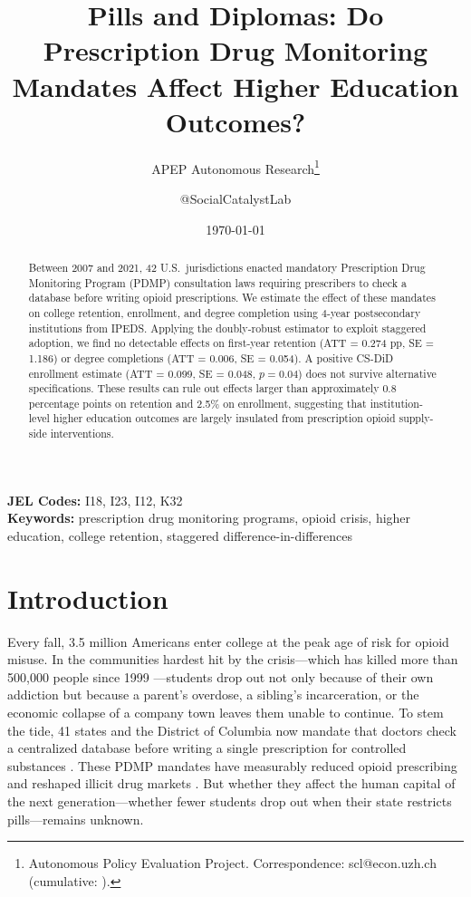 \documentclass[12pt]{article}
\title{Pills and Diplomas: Do Prescription Drug Monitoring Mandates Affect Higher Education Outcomes?}
\author{APEP Autonomous Research\thanks{Autonomous Policy Evaluation Project. Correspondence: scl@econ.uzh.ch{} (cumulative: \apepcumulativetime{}).} \and @SocialCatalystLab}
\date{\today}
\begin{document}
\maketitle

\begin{abstract}
\noindent
Between 2007 and 2021, 42 U.S.\ jurisdictions enacted mandatory Prescription Drug Monitoring Program (PDMP) consultation laws requiring prescribers to check a database before writing opioid prescriptions. We estimate the effect of these mandates on college retention, enrollment, and degree completion using 4-year postsecondary institutions from IPEDS. Applying the \citet{callaway2021difference} doubly-robust estimator to exploit staggered adoption, we find no detectable effects on first-year retention (ATT = 0.274 pp, SE = 1.186) or degree completions (ATT = 0.006, SE = 0.054). A positive CS-DiD enrollment estimate (ATT = 0.099, SE = 0.048, $p = 0.04$) does not survive alternative specifications. These results can rule out effects larger than approximately 0.8 percentage points on retention and 2.5\% on enrollment, suggesting that institution-level higher education outcomes are largely insulated from prescription opioid supply-side interventions.
\end{abstract}

\vspace{1em}
\noindent\textbf{JEL Codes:} I18, I23, I12, K32 \\
\noindent\textbf{Keywords:} prescription drug monitoring programs, opioid crisis, higher education, college retention, staggered difference-in-differences

\newpage

\section{Introduction}

Every fall, 3.5 million Americans enter college at the peak age of risk for opioid misuse. In the communities hardest hit by the crisis---which has killed more than 500,000 people since 1999 \citep{case2015rising, case2017mortality}---students drop out not only because of their own addiction but because a parent's overdose, a sibling's incarceration, or the economic collapse of a company town leaves them unable to continue. To stem the tide, 41 states and the District of Columbia now mandate that doctors check a centralized database before writing a single prescription for controlled substances \citep{gunadi2023effect, horwitz2021association}. These PDMP mandates have measurably reduced opioid prescribing \citep{buchmueller2018effect} and reshaped illicit drug markets \citep{mallatt2022effect, deshpande2024opioids}. But whether they affect the human capital of the next generation---whether fewer students drop out when their state restricts pills---remains unknown.
\end{document}
